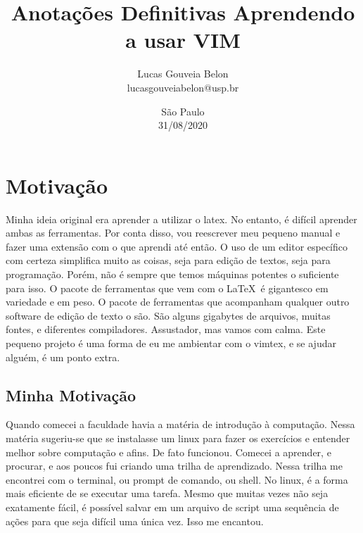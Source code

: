 \documentclass[a4paper, 12pt]{article}
\begin{document}
\title{
    \textbf{
    Anotações Definitivas
    }
    \break
    Aprendendo a usar VIM
}
\author{
    Lucas Gouveia Belon
    \\
    lucasgouveiabelon@usp.br
}

\date{\vspace{2.2cm}São Paulo\\31/08/2020}

\maketitle
\newpage
\tableofcontents
\newpage

\section{Motivação}
Minha ideia original era aprender a utilizar o latex.
No entanto, é difícil aprender ambas as ferramentas.
Por conta disso, vou reescrever meu pequeno manual e fazer uma extensão com o que aprendi até então.
O uso de um editor específico com certeza simplifica muito as coisas, seja para edição de textos, seja para programação.
Porém, não é sempre que temos máquinas potentes o suficiente para isso.
O pacote de ferramentas que vem com o \LaTeX\ é gigantesco em variedade e em peso.
O pacote de ferramentas que acompanham qualquer outro software de edição de texto o são.
São alguns gigabytes de arquivos, muitas fontes, e diferentes compiladores.
Assustador, mas vamos com calma.
Este pequeno projeto é uma forma de eu me ambientar com o vimtex, e se ajudar alguém, é um ponto extra.

\subsection{Minha Motivação}
Quando comecei a faculdade havia a matéria de introdução à computação.
Nessa matéria sugeriu-se que se instalasse um linux para fazer os exercícios e entender melhor sobre computação e afins.
De fato funcionou.
Comecei a aprender, e procurar, e aos poucos fui criando uma trilha de aprendizado.
Nessa trilha me encontrei com o terminal, ou prompt de comando, ou shell.
No linux, é a forma mais eficiente de se executar uma tarefa.
Mesmo que muitas vezes não seja exatamente fácil, é possível salvar em um arquivo de script uma sequência de ações para que seja difícil uma única vez.
Isso me encantou.
\end{document}
